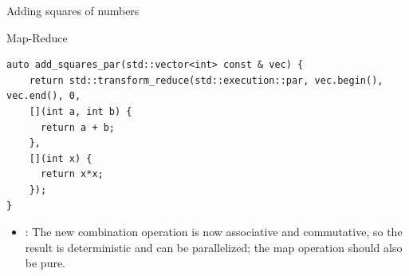 \begin{frame}[t,fragile]{Adding squares of numbers}

\begin{block}{Map-Reduce}
\begin{lstlisting}
auto add_squares_par(std::vector<int> const & vec) {
    return std::transform_reduce(std::execution::par, vec.begin(), vec.end(), 0, 
    [](int a, int b) {
      return a + b;
    },
    [](int x) {
      return x*x;
    });
}
\end{lstlisting}
\end{block}

\begin{itemize}
  \item {}: The new combination operation is now associative and commutative, so the result is deterministic and can be parallelized; the map operation should also be pure.
\end{itemize}

\end{frame}